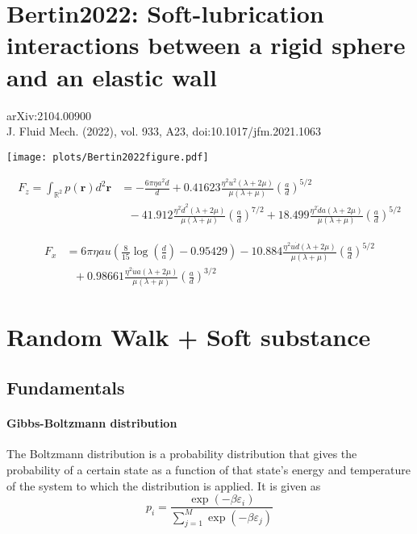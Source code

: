 \documentclass[books,12pt]{elegantpaper}
\newcommand{\bb}[1]{\mathbb{#1}}
\newcommand{\bf}[1]{\mathbf{#1}}
\newcommand{\ssc}{\subsection}
\newcommand{\parag}{\paragraph}
\newcommand{\veps}{\varepsilon}
\begin{document}
\newpage
\section{Bertin2022: Soft-lubrication interactions between a rigid sphere and an elastic wall}
arXiv:2104.00900 \\
J. Fluid Mech. (2022), vol. 933, A23, doi:10.1017/jfm.2021.1063

\begin{center}
\texttt{[image: plots/Bertin2022figure.pdf]}
\end{center}



\begin{equation} \begin{align}
F_z = \int_{\bb{R}^2} p(\mathbf{r}) d^2 \bf{r} &= - \frac{6 \pi \eta a^2 \dot{d}}{d} + 0.41623 \frac{\eta^2 u^2 (\lambda + 2\mu)}{\mu (\lambda +\mu)} \left( \frac{a}{d} \right)^{5/2} \\ %
& \ \ \ - 41.912 \frac{\eta^2 \dot{d}^2 (\lambda + 2\mu)}{\mu (\lambda + \mu)} \left( \frac{a}{d} \right)^{7/2} + 18.499 \frac{\eta^2 \ddot{d} a (\lambda + 2\mu)}{\mu (\lambda + \mu)} \left( \frac{a}{d} \right)^{5/2} %
\end{align} \tag{Bertin2022.3.21} \label{Bertin2022.3.21} \end{equation}

\begin{equation} \begin{align}
F_x &= 6 \pi \eta a u \left( \frac{8}{15} \log\left(\frac{d}{a}\right) - 0.95429 \right) - 10.884 \frac{\eta^2 u \dot{d} (\lambda + 2\mu)}{\mu (\lambda +\mu)} \left( \frac{a}{d} \right)^{5/2} \\ %
& \ \ \ + 0.98661 \frac{\eta^2 \dot{u} a (\lambda + 2\mu)}{\mu (\lambda + \mu)} \left( \frac{a}{d} \right)^{3/2} %
\end{align} \tag{Bertin2022.3.24} \label{Bertin2022.3.24} \end{equation}




\newpage
\section{Random Walk + Soft substance}
\ssc{Fundamentals}
\parag{Gibbs-Boltzmann distribution} The Boltzmann distribution is a probability distribution that gives the probability of a certain state as a function of that state's energy and temperature of the system to which the distribution is applied. It is given as
$$ p_i = \frac{\exp(-\beta \veps_i)}{\sum_{j=1}^M \exp(-\beta \veps_j)} $$
\end{document}
